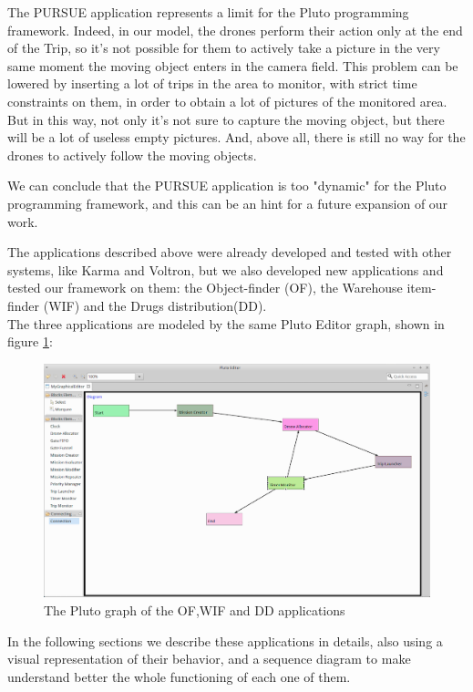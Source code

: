 The PURSUE application represents a limit for the Pluto programming framework.
Indeed, in our model, the drones perform their action only at the end of the Trip, so it's not possible for them to actively take a picture in the very same moment the moving object enters in the camera field.
This problem can be lowered by inserting a lot of trips in the area to monitor, with strict time constraints on them, in order to obtain a lot of pictures of the monitored area.
But in this way, not only it's not sure to capture the moving object, but there will be a lot of useless empty pictures.
And, above all, there is still no way for the drones to actively follow the moving objects.

We can conclude that the PURSUE application is too "dynamic" for the Pluto programming framework, and this can be an hint for a future expansion of our work.


\newpage

The applications described above were already developed and tested with other systems, like Karma\cite{karma} and Voltron\cite{voltron}, but we also developed new applications and tested our framework on them:
the Object-finder (OF), the Warehouse item-finder (WIF) and the Drugs distribution(DD).
\\

The three applications are modeled by the same Pluto Editor graph, shown in figure \ref{fig:plutoGraph}:

\begin{figure}[H]
  \centering
  \includegraphics[width=\linewidth]{pictures/EditorScreen.png}
  \caption{The Pluto graph of the OF,WIF and DD applications}
  \label{fig:plutoGraph}
\end{figure}

In the following sections we describe these applications in details, also using a visual representation of their behavior, and a sequence diagram to make understand better the whole functioning of each one of them.

